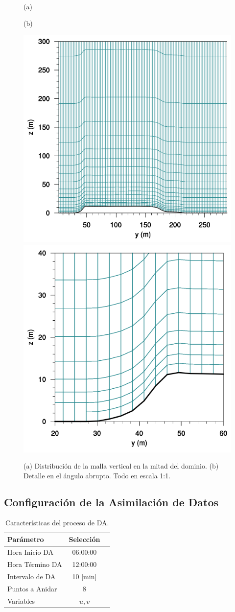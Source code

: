 \begin{figure}[H]
	\centering
	\begin{minipage}{0.5\linewidth}
		\center\hspace{1.8cm}(a)
	\end{minipage}%
	\begin{minipage}{0.5\linewidth}
		\center(b)
	\end{minipage}%
	
	\includegraphics[width=0.45\linewidth,trim={0cm 0cm -0cm 0cm},clip]{Imagenes/05/mesh_y50}%
	\includegraphics[width=0.45\linewidth,trim={0cm 0cm 0cm 0cm},clip]{Imagenes/05/hd_mesh_50}%
	
	\caption{(a) Distribución de la malla vertical en la mitad del dominio. (b) Detalle en el ángulo abrupto. Todo en escala 1:1.}
	\label{fig:05_mesh_bol}
\end{figure}

\subsection{Configuración de la Asimilación de Datos}

\begin{table}[h!]
	\caption{Características del proceso de DA.}\label{tab:05_config_da_bol}
	\centering\footnotesize
	\begin{tabular}{lcc}
		\toprule
		Parámetro & Selección \\
		\midrule
		Hora Inicio	DA 	 & 06:00:00   \\
		Hora Término DA	 		 & 12:00:00  \\
		Intervalo de DA	&	10 [min] \\
		Puntos a Anidar	 	 & 8   \\
		Variables	& $u,v$   \\
		\bottomrule
	\end{tabular}
\end{table}

